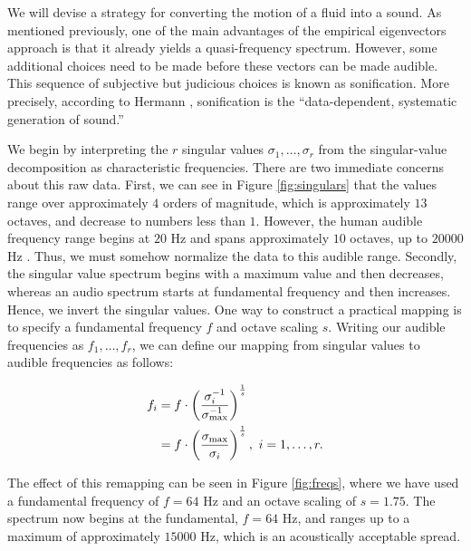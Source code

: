 \documentclass[11pt]{article}
\begin{document}
We will devise a strategy for converting the motion of a fluid into a sound. As mentioned previously, one of the main advantages of the empirical eigenvectors approach is that it already yields a quasi-frequency spectrum. However, some additional choices need to be made before these vectors can be made audible. This sequence of subjective but judicious choices is known as sonification. More precisely, according to Hermann \cite{hermann2008}, sonification is the ``data-dependent, systematic generation of sound.''

We begin by interpreting the $r$ singular values $\sigma_1, \ldots, \sigma_r$ from the singular-value decomposition as characteristic frequencies. There are two immediate concerns about this raw data. First, we can see in Figure \ref{fig:singulars} that the values range over approximately $4$ orders of magnitude, which is approximately $13$ octaves, and decrease to numbers less than $1$. However, the human audible frequency range begins at $20$ Hz and spans approximately $10$ octaves, up to $20000$ Hz \cite{rosen2011signals}. Thus, we must somehow normalize the data to this audible range. Secondly, the singular value spectrum begins with a maximum value and then decreases, whereas an audio spectrum starts at fundamental frequency and then increases. Hence, we invert the singular values. One way to construct a practical mapping is to specify a fundamental frequency $f$ and octave scaling $s$. Writing our audible frequencies as $f_1, \ldots, f_r$, we can define our mapping from singular values to audible frequencies as follows:

\begin{equation} 
\begin{aligned}
f_i &= f \cdot \left(\frac{\sigma_{i}^{-1}}{\sigma_{\textnormal{max}}^{-1}}\right)^{\frac{1}{s}} \\
&= f \cdot \left(\frac{\sigma_{\textnormal{max}}}{\sigma_i}\right)^{\frac{1}{s}}, \ i = 1, \ldots, r.
\end{aligned}
\end{equation}

The effect of this remapping can be seen in Figure \ref{fig:freqs}, where we have used a fundamental frequency of $f = 64$ Hz and an octave scaling of $s = 1.75$. The spectrum now begins at the fundamental, $f = 64$ Hz, and ranges up to a maximum of approximately $15000$ Hz, which is an acoustically acceptable spread.
\end{document}
